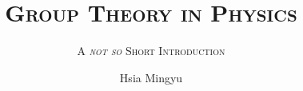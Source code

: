 \documentclass[mtpro2,amsthm]{litebook}
\title{\scshape Group Theory in Physics}
\subtitle{\scshape A \emph{not so} Short Introduction}
\author{Hsia Mingyu}
\begin{document}
\maketitle
\frontmatter\tableofcontents\mainmatter


% 


\nocite{*}
\end{document}
